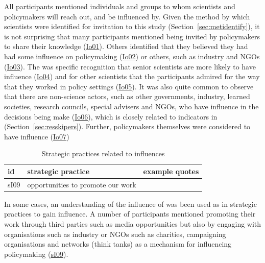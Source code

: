 All participants mentioned individuals and groups to whom scientists and policymakers will reach out, and be influenced by. Given the method by which scientists were identified for invitation to this study (Section~\ref{sec:metidentify}), it is not surprising that many participants mentioned being invited by policymakers to share their knowledge (\hyperref[tab:resskiopin]{Io01}). Others identified that they believed they had had some influence on policymaking (\hyperref[tab:resskiopin]{Io02}) or others, such as industry and NGOs (\hyperref[tab:resskiopin]{Io03}). The was specific recognition that senior scientists are more likely to have influence (\hyperref[tab:resskiopin]{Io04}) and for other scientists that the participants admired for the way that they worked in policy settings (\hyperref[tab:resskiopin]{Io05}). It was also quite common to observe that there are non-science actors, such as other governments, industry, learned societies, research councils, special advisers and NGOs, who have influence in the decisions being make (\hyperref[tab:resskiopin]{Io06}), which is closely related to indicators in \skipers{} (Section~\ref{sec:resskipers}). Further, policymakers themselves were considered to have influence (\hyperref[tab:resskiopin]{Io07})

\begin{table}[!ht]
\footnotesize
\caption{Strategic practices related to \skiopin{} influences}\label{tab:resskiopinstrat}
\begin{tabular}{L{.06\linewidth}L{.3\linewidth}L{.64\linewidth}} \hline
\textbf{id} & \textbf{strategic practice} & \textbf{example quotes} \\ \hline \hline
sI09 & opportunities to promote our work &  \\
\hline
 \end{tabular}
\end{table}

In some cases, an understanding of the influence of \skiopin{} was been used as in strategic practices to gain influence. A number of participants mentioned promoting their work through third parties such as media opportunities but also by engaging with organisations such as industry or NGOs such as charities, campaigning organisations and networks (think tanks) as a mechanism for influencing policymaking (\hyperref[tab:resskiopinstrat]{sI09}).

\subsection{\titnetw}\label{sec:resskinetw}

